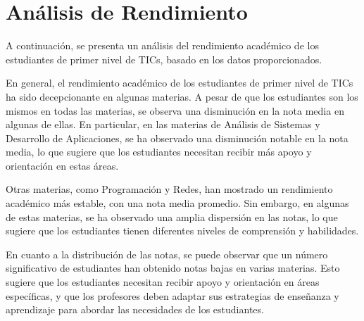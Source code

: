 \vspace{1cm}
\section{Análisis de Rendimiento}
A continuación, se presenta un análisis del rendimiento académico de los estudiantes de primer nivel de TICs, basado en los datos proporcionados.

En general, el rendimiento académico de los estudiantes de primer nivel de TICs ha sido decepcionante en algunas materias. A pesar de que los estudiantes son los mismos en todas las materias, se observa una disminución en la nota media en algunas de ellas. En particular, en las materias de Análisis de Sistemas y Desarrollo de Aplicaciones, se ha observado una disminución notable en la nota media, lo que sugiere que los estudiantes necesitan recibir más apoyo y orientación en estas áreas.

Otras materias, como Programación y Redes, han mostrado un rendimiento académico más estable, con una nota media promedio. Sin embargo, en algunas de estas materias, se ha observado una amplia dispersión en las notas, lo que sugiere que los estudiantes tienen diferentes niveles de comprensión y habilidades.

En cuanto a la distribución de las notas, se puede observar que un número significativo de estudiantes han obtenido notas bajas en varias materias. Esto sugiere que los estudiantes necesitan recibir apoyo y orientación en áreas específicas, y que los profesores deben adaptar sus estrategias de enseñanza y aprendizaje para abordar las necesidades de los estudiantes.

